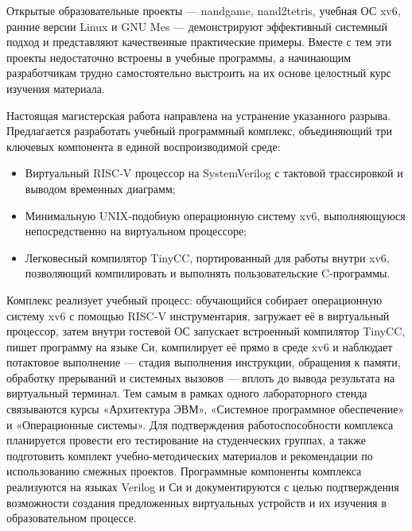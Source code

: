 Открытые образовательные проекты — nandgame, nand2tetris, учебная ОС xv6, ранние версии Linux и GNU Mes — демонстрируют эффективный системный подход и представляют качественные практические примеры. Вместе с тем эти проекты недостаточно встроены в учебные программы, а начинающим разработчикам трудно самостоятельно выстроить на их основе целостный курс изучения материала.

Настоящая магистерская работа направлена на устранение указанного разрыва. Предлагается разработать учебный программный комплекс, объединяющий три ключевых компонента в единой воспроизводимой среде:

\begin{itemize}
  \item Виртуальный RISC‑V процессор на SystemVerilog с тактовой трассировкой и выводом временных диаграмм;
  \item Минимальную UNIX‑подобную операционную систему xv6, выполняющуюся непосредственно на виртуальном процессоре;
  \item Легковесный компилятор TinyCC, портированный для работы внутри xv6, позволяющий компилировать и выполнять пользовательские C-программы.
\end{itemize}

Комплекс реализует учебный процесс: обучающийся собирает операционную систему xv6 с помощью RISC‑V инструментария, загружает её в виртуальный процессор, затем внутри гостевой ОС запускает встроенный компилятор TinyCC, пишет программу на языке Си, компилирует её прямо в среде xv6 и наблюдает потактовое выполнение — стадия выполнения инструкции, обращения к памяти, обработку прерываний и системных вызовов — вплоть до вывода результата на виртуальный терминал. Тем самым в рамках одного лабораторного стенда связываются курсы «Архитектура ЭВМ», «Системное программное обеспечение» и «Операционные системы». Для подтверждения работоспособности комплекса планируется провести его тестирование на студенческих группах, а также подготовить комплект учебно-методических материалов и рекомендации по использованию смежных проектов. Программные компоненты комплекса реализуются на языках Verilog и Си и документируются с целью подтверждения возможности создания предложенных виртуальных устройств и их изучения в образовательном процессе.

